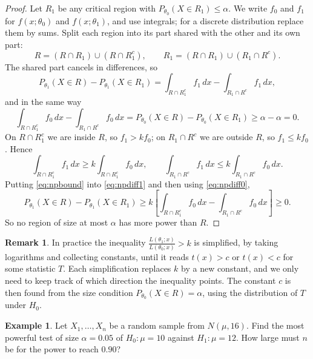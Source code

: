 \documentclass[12pt,a4paper]{report}
\theoremstyle{definition}
\newtheorem{example}[thm]{Example}
\newtheorem{remark}[thm]{Remark}
\theoremstyle{plain}
\begin{document}
\begin{proof}
Let $R_1$ be any critical region with $P_{\theta_0}(X\in R_1)\le\alpha$. We write
$f_0$ and $f_1$ for $f(x;\theta_0)$ and $f(x;\theta_1)$, and use integrals; for a
discrete distribution replace them by sums. Split each region into its part shared
with the other and its own part:
\[R = (R\cap R_1)\cup(R\cap R_1^c),\qquad R_1 = (R\cap R_1)\cup(R_1\cap R^c).\]
The shared part cancels in differences, so
\begin{equation}
\label{eq:npdiff1}
P_{\theta_1}(X\in R) - P_{\theta_1}(X\in R_1)
= \int_{R\cap R_1^c} f_1\,dx - \int_{R_1\cap R^c} f_1\,dx ,
\end{equation}
and in the same way
\begin{equation}
\label{eq:npdiff0}
\int_{R\cap R_1^c} f_0\,dx - \int_{R_1\cap R^c} f_0\,dx
= P_{\theta_0}(X\in R) - P_{\theta_0}(X\in R_1) \ge \alpha - \alpha = 0 .
\end{equation}
On $R\cap R_1^c$ we are inside $R$, so $f_1>k f_0$; on $R_1\cap R^c$ we are
outside $R$, so $f_1\le k f_0$. Hence
\begin{equation}
\label{eq:npbound}
\int_{R\cap R_1^c} f_1\,dx \ge k\int_{R\cap R_1^c} f_0\,dx,\qquad
\int_{R_1\cap R^c} f_1\,dx \le k\int_{R_1\cap R^c} f_0\,dx .
\end{equation}
Putting \eqref{eq:npbound} into \eqref{eq:npdiff1} and then using
\eqref{eq:npdiff0},
\[P_{\theta_1}(X\in R) - P_{\theta_1}(X\in R_1)
\ge k\left[\int_{R\cap R_1^c} f_0\,dx - \int_{R_1\cap R^c} f_0\,dx\right]\ge 0 .\]
So no region of size at most $\alpha$ has more power than $R$.
\end{proof}

\begin{remark}
\label{rem:npuse}
In practice the inequality $\frac{L(\theta_1;x)}{L(\theta_0;x)}>k$ is simplified,
by taking logarithms and collecting constants, until it reads $t(x)>c$ or
$t(x)<c$ for some statistic $T$. Each simplification replaces $k$ by a new
constant, and we only need to keep track of which direction the inequality points.
The constant $c$ is then found from the size condition
$P_{\theta_0}(X\in R) = \alpha$, using the distribution of $T$ under $H_0$.
\end{remark}

\begin{example}
\label{ex:mpnormal16}
Let $X_1,\dots,X_n$ be a random sample from $N(\mu,16)$. Find the most powerful
test of size $\alpha = 0.05$ of $H_0\colon\mu = 10$ against $H_1\colon\mu = 12$.
How large must $n$ be for the power to reach $0.90$?
\end{example}
\end{document}
